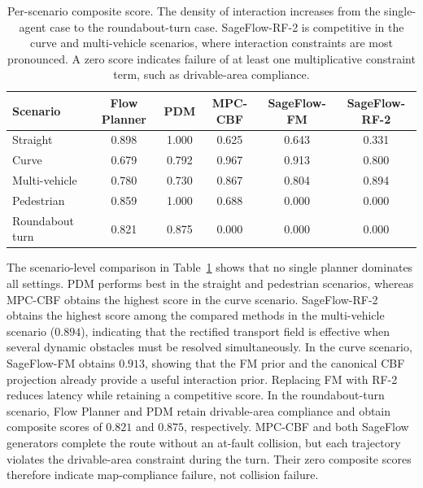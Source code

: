 \begin{table}[t]
    \centering
    \small
    \caption{Per-scenario composite score.  The density of interaction
    increases from the single-agent case to the roundabout-turn case.
    SageFlow-RF-2 is competitive in the curve and multi-vehicle
    scenarios, where interaction constraints are most pronounced.  A
    zero score indicates failure of at least one multiplicative
    constraint term, such as drivable-area compliance.}
    \label{tab:scenario_scores}
    \begin{tabular}{lccccc}
        \toprule
        Scenario & Flow Planner & PDM & MPC-CBF & SageFlow-FM & SageFlow-RF-2 \\
        \midrule
        Straight      & 0.898 & 1.000 & 0.625 & 0.643 & 0.331 \\
        Curve         & 0.679 & 0.792 & 0.967 & 0.913 & 0.800 \\
        Multi-vehicle & 0.780 & 0.730 & 0.867 & 0.804 & 0.894 \\
        Pedestrian    & 0.859 & 1.000 & 0.688 & 0.000 & 0.000 \\
        Roundabout turn & 0.821 & 0.875 & 0.000 & 0.000 & 0.000 \\
        \bottomrule
    \end{tabular}
\end{table}

The scenario-level comparison in Table~\ref{tab:scenario_scores}
shows that no single planner dominates all settings.  PDM performs
best in the straight and pedestrian scenarios, whereas MPC-CBF obtains
the highest score in the curve scenario.  SageFlow-RF-2 obtains the
highest score among the compared methods in the multi-vehicle scenario
(\(0.894\)), indicating that the rectified transport field is effective
when several dynamic obstacles must be resolved simultaneously.
In the curve scenario, SageFlow-FM obtains \(0.913\), showing that the
FM prior and the canonical CBF projection already provide a useful
interaction prior.  Replacing FM with RF-2 reduces latency while
retaining a competitive score.
In the roundabout-turn scenario, Flow Planner and PDM retain
drivable-area compliance and obtain composite scores of \(0.821\) and
\(0.875\), respectively.  MPC-CBF and both SageFlow generators complete
the route without an at-fault collision, but each trajectory violates
the drivable-area constraint during the turn.  Their zero composite
scores therefore indicate map-compliance failure, not collision
failure.

